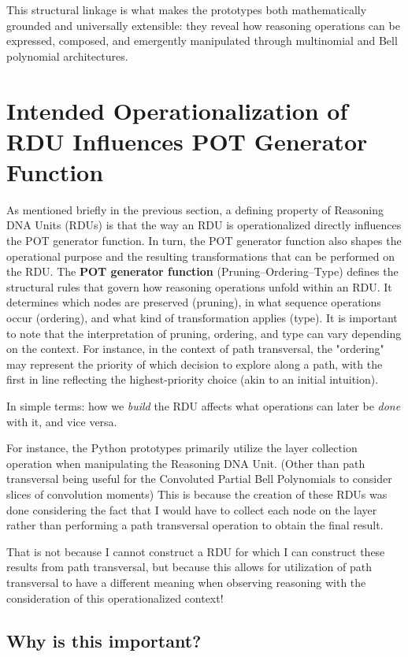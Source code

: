 \documentclass[11pt]{article}
\begin{document}
This structural linkage is what makes the prototypes both mathematically grounded and universally extensible: they reveal how reasoning operations can be expressed, composed, and emergently manipulated through multinomial and Bell polynomial architectures.

\section{Intended Operationalization of RDU Influences POT Generator Function}

As mentioned briefly in the previous section, a defining property of Reasoning DNA Units (RDUs) is that the way an RDU is operationalized directly influences the POT generator function. In turn, the POT generator function also shapes the operational purpose and the resulting transformations that can be performed on the RDU. The \textbf{POT generator function} (Pruning–Ordering–Type) defines the structural rules that govern how reasoning operations unfold within an RDU. It determines which nodes are preserved (pruning), in what sequence operations occur (ordering), and what kind of transformation applies (type). It is important to note that the interpretation of pruning, ordering, and type can vary depending on the context. 
For instance, in the context of path transversal, the "ordering" may represent the priority of which decision to explore along a path, with the first in line reflecting the highest-priority choice (akin to an initial intuition).

In simple terms: how we \textit{build} the RDU affects what operations can later be \textit{done} with it, and vice versa.

For instance, the Python prototypes primarily utilize the layer collection operation when manipulating the Reasoning DNA Unit. (Other than path transversal being useful for the Convoluted Partial Bell Polynomials to consider slices of convolution moments) This is because the creation of these RDUs was done considering the fact that I would have to collect each node on the layer rather than performing a path transversal operation to obtain the final result.

That is not because I cannot construct a RDU for which I can construct these results from path transversal, but because this allows for utilization of path transversal to have a different meaning when observing reasoning with the consideration of this operationalized context!

\subsection*{Why is this important?}
\end{document}
